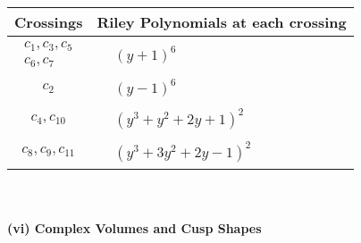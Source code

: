 \documentclass[1p]{elsarticle_modified}
\theoremstyle{definition}
\begin{document}
\begin{tabular}{m{50pt}|m{274pt}}
Crossings & \hspace{64pt}Riley Polynomials at each crossing \\
\hline $$\begin{aligned}c_{1},c_{3},c_{5}\\c_{6},c_{7}\end{aligned}$$&$\begin{aligned}
&(y+1)^6
\end{aligned}$\\
\hline $$\begin{aligned}c_{2}\end{aligned}$$&$\begin{aligned}
&(y-1)^6
\end{aligned}$\\
\hline $$\begin{aligned}c_{4},c_{10}\end{aligned}$$&$\begin{aligned}
&(y^3+y^2+2 y+1)^2
\end{aligned}$\\
\hline $$\begin{aligned}c_{8},c_{9},c_{11}\end{aligned}$$&$\begin{aligned}
&(y^3+3 y^2+2 y-1)^2
\end{aligned}$\\
\hline
\end{tabular}\\~\\
\newpage\flushleft \textbf{(vi) Complex Volumes and Cusp Shapes}
\end{document}
